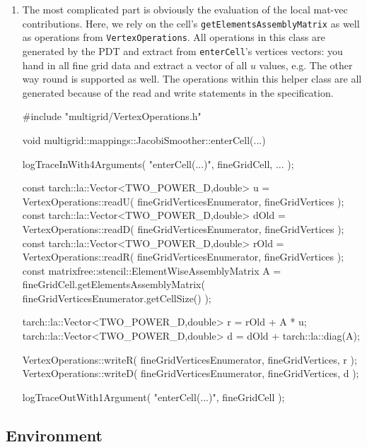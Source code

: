 \begin{enumerate}
    \item The most complicated part is obviously the evaluation of the local
    mat-vec contributions. Here, we rely on the cell's
    \texttt{getElementsAssemblyMatrix} as well as operations from \newline
    \texttt{VertexOperations}. All operations in this class are generated by the
    PDT and extract from \texttt{enterCell}'s vertices vectors: you hand in all
    fine grid data and extract a vector of all $u$ values, e.g. The other way
    round is supported as well. The operations within this helper class are all
    generated because of the read and write statements in the specification. 
    \begin{code}
#include "multigrid/VertexOperations.h"

void multigrid::mappings::JacobiSmoother::enterCell(...) {
  logTraceInWith4Arguments( "enterCell(...)", fineGridCell, ... );

  const tarch::la::Vector<TWO_POWER_D,double> u    =
    VertexOperations::readU( fineGridVerticesEnumerator, fineGridVertices );
  const tarch::la::Vector<TWO_POWER_D,double> dOld    =
    VertexOperations::readD( fineGridVerticesEnumerator, fineGridVertices );
  const tarch::la::Vector<TWO_POWER_D,double> rOld =
    VertexOperations::readR( fineGridVerticesEnumerator, fineGridVertices );
  const matrixfree::stencil::ElementWiseAssemblyMatrix A =
    fineGridCell.getElementsAssemblyMatrix( fineGridVerticesEnumerator.getCellSize() );

  tarch::la::Vector<TWO_POWER_D,double> r = rOld + A * u;
  tarch::la::Vector<TWO_POWER_D,double> d = dOld + tarch::la::diag(A);

  VertexOperations::writeR( fineGridVerticesEnumerator, fineGridVertices, r );
  VertexOperations::writeD( fineGridVerticesEnumerator, fineGridVertices, d );

  logTraceOutWith1Argument( "enterCell(...)", fineGridCell );
}
    \end{code}
\end{enumerate}



\subsection{Environment}

